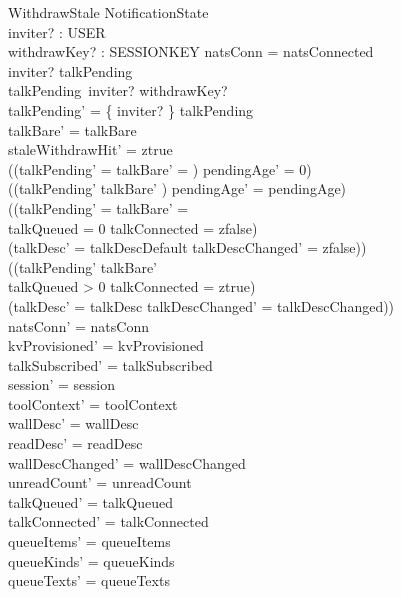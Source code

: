 \documentclass[a4paper,10pt,fleqn]{article}
\begin{document}
\begin{schema}{WithdrawStale}
  \Delta NotificationState \\
  inviter? : USER \\
  withdrawKey? : SESSIONKEY
  \where
  natsConn = natsConnected \\
  inviter? \in \dom talkPending \\
  talkPending~inviter? \neq withdrawKey? \\
  talkPending' = \{ inviter? \} \ndres talkPending \\
  talkBare' = talkBare \\
  staleWithdrawHit' = ztrue \\
  ((\dom talkPending' = \emptyset \land talkBare' = \emptyset) \implies
  pendingAge' = 0) \\
  ((\dom talkPending' \neq \emptyset \lor talkBare' \neq \emptyset) \implies
  pendingAge' = pendingAge) \\
  ((\dom talkPending' = \emptyset \land talkBare' = \emptyset \land \\
  \quad talkQueued = 0 \land talkConnected = zfalse) \implies \\
  \quad (talkDesc' = talkDescDefault \land talkDescChanged' = zfalse)) \\
  ((\dom talkPending' \neq \emptyset \lor talkBare' \neq \emptyset \lor \\
  \quad talkQueued > 0 \lor talkConnected = ztrue) \implies \\
  \quad (talkDesc' = talkDesc \land talkDescChanged' = talkDescChanged)) \\
  natsConn' = natsConn \\
  kvProvisioned' = kvProvisioned \\
  talkSubscribed' = talkSubscribed \\
  session' = session \\
  toolContext' = toolContext \\
  wallDesc' = wallDesc \\
  readDesc' = readDesc \\
  wallDescChanged' = wallDescChanged \\
  unreadCount' = unreadCount \\
  talkQueued' = talkQueued \\
  talkConnected' = talkConnected \\
  queueItems' = queueItems \\
  queueKinds' = queueKinds \\
  queueTexts' = queueTexts \\

\end{schema}
\end{document}
